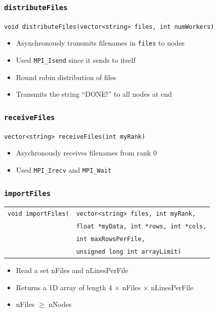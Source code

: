 \documentclass[usernames,dvipsnames]{beamer}
\begin{document}

\begin{frame}
	\frametitle{\texttt{distributeFiles}}
	
    		\texttt{void distributeFiles(vector<string> files, int numWorkers)}
    		\begin{itemize}
    		    \item Asynchronously transmits filenames in \texttt{files} to nodes
    			\item Used \texttt{MPI\_Isend} since it sends to itself
    			\item Round robin distribution of files
    			\item Transmits the string ``DONE!'' to all nodes at end
    		\end{itemize}
    		
\end{frame}



\begin{frame}
	\frametitle{\texttt{receiveFiles}}
	
    		\texttt{vector<string> receiveFiles(int myRank)}
    		\begin{itemize}
    			\item Asychronously receives filenames from rank 0
    			\item Used \texttt{MPI\_Irecv} and \texttt{MPI\_Wait}
    		\end{itemize}
    		
\end{frame}



\begin{frame}
	\frametitle{\texttt{importFiles}}
	
	\begin{tabular}{l l}
    		\texttt{void importFiles(} & \texttt{vector<string> files, int myRank,} \\
	& \texttt{float *myData, int *rows, int *cols,} \\
	& \texttt{int maxRowsPerFile,} \\
	& \texttt{unsigned long int arrayLimit)} \\
	\end{tabular}
	
    		\begin{itemize}
    			\item Read a set nFiles and nLinesPerFile
    			\item Returns a 1D array of length 4 $\times$ nFiles $\times$ nLinesPerFile
    			\item nFiles $\ge$ nNodes
    		\end{itemize}
    		
\end{frame}
\end{document}
